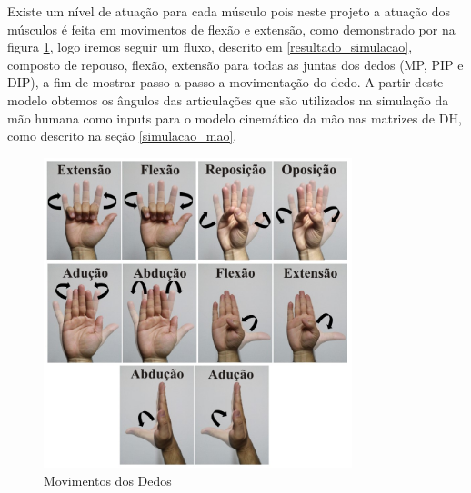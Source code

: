Existe um nível de atuação para cada músculo pois neste projeto a atuação dos músculos é feita em movimentos de flexão e extensão, como demonstrado por \cite{oliveira2016modelagem} na figura \ref{movimentos_mao}, logo iremos seguir um fluxo, descrito em \ref{resultado_simulacao}, composto de repouso, flexão, extensão para todas as juntas dos dedos (MP, PIP e DIP), a fim de mostrar passo a passo a movimentação do dedo. A partir deste modelo obtemos os ângulos das articulações que são utilizados na simulação da mão humana como inputs para o modelo cinemático da mão nas matrizes de DH, como descrito na seção \ref{simulacao_mao}. 

\begin{figure}[H]
\centering
\includegraphics[width = 0.8\textwidth]{img/Oliveira_Movimentos.jpg}
\caption[Movimentos dos Dedos \cite{oliveira2016modelagem}]{Movimentos dos Dedos}
\label{movimentos_mao}
\end{figure}